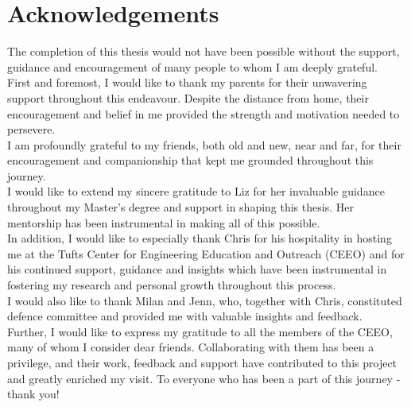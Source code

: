 \chapter*{Acknowledgements}%
%
%

The completion of this thesis would not have been possible without the support, guidance and encouragement of many people to whom I am deeply grateful.\\

First and foremost, I would like to thank my parents for their unwavering support throughout this endeavour. Despite the distance from home, their encouragement and belief in me provided the strength and motivation needed to persevere.\\

I am profoundly grateful to my friends, both old and new, near and far, for their encouragement and companionship that kept me grounded throughout this journey. \\

I would like to extend my sincere gratitude to Liz for her invaluable guidance throughout my Master's degree and support in shaping this thesis. Her mentorship has been instrumental in making all of this possible. \\

In addition, I would like to especially thank Chris for his hospitality in hosting me at the Tufts Center for Engineering Education and Outreach (CEEO) and for his continued support, guidance and insights which have been instrumental in fostering my research and personal growth throughout this process. \\

I would also like to thank Milan and Jenn, who, together with Chris, constituted defence committee and provided me with valuable insights and feedback. \\

Further, I would like to express my gratitude to all the members of the CEEO, many of whom I consider dear friends. Collaborating with them has been a privilege, and their work, feedback and support have contributed to this project and greatly enriched my visit. To everyone who has been a part of this journey - thank you!